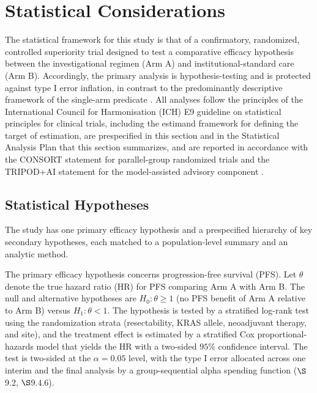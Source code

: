 \section{Statistical Considerations}

The statistical framework for this study is that of a confirmatory, randomized,
controlled superiority trial designed to test a comparative efficacy hypothesis
between the investigational regimen (Arm A) and institutional-standard care (Arm B).
Accordingly, the primary analysis is hypothesis-testing and is protected against type
I error inflation, in contrast to the predominantly descriptive framework of the
single-arm predicate \cite{kawchak2026phase1}. All analyses follow the principles of
the International Council for Harmonisation (ICH) E9 guideline on statistical
principles for clinical trials, including the estimand framework for defining the
target of estimation, are prespecified in this section and in the Statistical
Analysis Plan that this section summarizes, and are reported in accordance with the
CONSORT statement for parallel-group randomized trials \cite{Schulz2010consort} and
the TRIPOD+AI statement for the model-assisted advisory component
\cite{Collins2024tripodai}.

\subsection{Statistical Hypotheses}

The study has one primary efficacy hypothesis and a prespecified hierarchy of key
secondary hypotheses, each matched to a population-level summary and an analytic
method.

The primary efficacy hypothesis concerns progression-free survival (PFS). Let
$\theta$ denote the true hazard ratio (HR) for PFS comparing Arm A with Arm B. The
null and alternative hypotheses are $H_0\!: \theta \geq 1$ (no PFS benefit of Arm A
relative to Arm B) versus $H_1\!: \theta < 1$. The hypothesis is tested by a
stratified log-rank test using the randomization strata (resectability, KRAS allele,
neoadjuvant therapy, and site), and the treatment effect is estimated by a stratified
Cox proportional-hazards model that yields the HR with a two-sided $95\%$ confidence
interval. The test is two-sided at the $\alpha = 0.05$ level, with the type I error
allocated across one interim and the final analysis by a group-sequential alpha
spending function ($\S$9.2, $\S$9.4.6).


